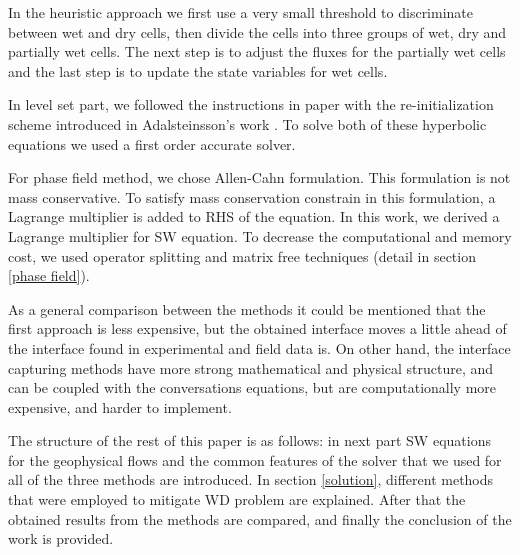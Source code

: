 \documentclass[letterpaper,10pt]{article}
\begin{document}

In the heuristic approach we first use a very small threshold to discriminate between wet and dry cells, then divide the cells into three groups of wet, dry and partially wet cells. The next step is to adjust the fluxes for the partially wet cells and the last step is to update the state variables for wet cells.\newline

In level set part, we followed the instructions in paper\cite{Sussman} with the re-initialization scheme introduced in Adalsteinsson's work \cite{Adalsteinsson1995}. To solve both of these hyperbolic equations we used a first order accurate solver.\newline

For phase field method, we chose Allen-Cahn formulation. This formulation is not mass conservative. To satisfy mass conservation constrain in this formulation, a Lagrange multiplier is added to RHS of the equation. In this work, we derived a Lagrange multiplier for SW equation. To decrease the computational and memory cost, we used operator splitting and matrix free techniques (detail in section \ref{phase field}). \newline

As a general comparison between the methods it could be mentioned that the first approach is less expensive, but the obtained interface moves a little ahead of the interface found in experimental and field data is. 
On other hand, the interface capturing methods have more strong mathematical and physical structure, and can be coupled with the conversations equations, but are computationally more expensive, and harder to implement.\newline

The structure of the rest of this paper is as follows: in next part SW equations for the geophysical flows and the common features of the solver that we used for all of the three methods are introduced. In section \ref{solution}, 
different methods that were employed to mitigate WD problem are explained. After that the obtained results from the methods are compared, and finally the conclusion of the work is provided.
\end{document}
